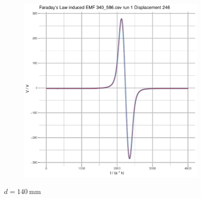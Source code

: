 \documentclass[a4paper,11pt]{article}
\begin{document}
\begin{figure}[b]
\begin{subfigure}{.5\textwidth}
\end{subfigure}
\begin{subfigure}{.7\textwidth}
    \centering
    \includegraphics[width=\textwidth,page=9]{Rplots.pdf}
\end{subfigure}
\caption{\(d = \SI{140}{\milli\metre}\)}
\end{figure}
\end{document}

